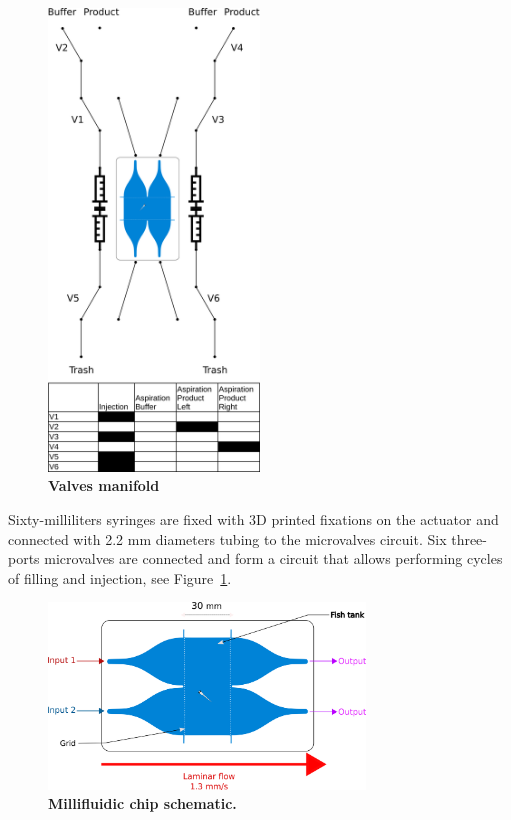     \begin{figure}[h!]
      \centering
      \includegraphics[width=0.50\textwidth]{part_2/assets/valve_schematic.png}
      \caption{\textbf{Valves manifold}}
      \label{valves_schematic}
    \end{figure}

  Sixty-milliliters syringes are fixed with 3D printed fixations on the actuator and connected with 2.2 mm diameters tubing to the microvalves circuit. Six three-ports microvalves are connected and form a circuit that allows performing cycles of filling and injection, see Figure~\ref{valves_schematic}.

    \begin{figure}[h!]
      \centering
      \includegraphics[width=0.75\textwidth]{part_2/assets/chip.png}
      \caption{\textbf{Millifluidic chip schematic.}}
      \label{dual_chip}
    \end{figure}

